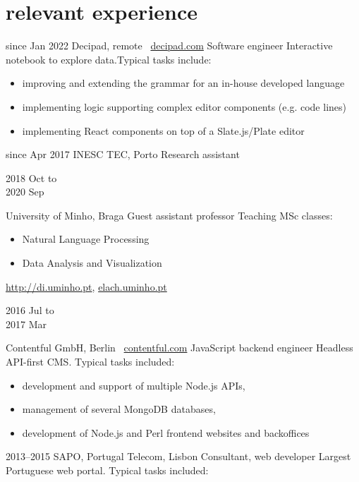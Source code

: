 \documentclass[a4paper]{friggeri-cv}
\begin{document}
\section{relevant experience}
\begin{entrylist}
  \entry
    {{\tiny since} Jan 2022}
    {Decipad, remote \textendash~\url{decipad.com}}
    {Software engineer}
    {Interactive  notebook to explore data.\footnotesize{Typical tasks
    include:}}
    {\begin{itemize}
      \item improving and extending the grammar for an in-house developed language
      \item implementing logic supporting complex editor components (e.g. code lines)
      \item implementing React components on top of a Slate.js/Plate editor
    \end{itemize}}
  \entry
    {{\tiny since} Apr 2017}
    {INESC TEC, Porto}
    {Research assistant}
    {\vspace{-0.7cm}}
    {}
  \entry
    {\parbox[t][][t]{1.8cm}{2018 {\footnotesize Oct to}\\2020
    {\footnotesize Sep}}}
    {University of Minho, Braga}
    {Guest assistant professor}
    {Teaching MSc classes:}
    {\begin{itemize}
        \item Natural Language Processing
        \item Data Analysis and Visualization
    \end{itemize}
    \url{http://di.uminho.pt}, \url{elach.uminho.pt}
    }
  \entry
    {\parbox[t][][t]{1.8cm}{2016 {\footnotesize Jul to}\\2017 {\footnotesize Mar}}}
    {Contentful GmbH, Berlin \textendash~\url{contentful.com}}
    {JavaScript backend engineer}
    {Headless API-first CMS. \footnotesize{Typical tasks
    included:}}
    {\begin{itemize}
        \item development and support of multiple Node.js APIs,
        \item management of several MongoDB databases,
        \item development of Node.js and Perl frontend websites and backoffices
    \end{itemize}
    }
  \entry
    {2013--2015}
    {SAPO, Portugal Telecom, Lisbon}
    {Consultant, web developer}
    {Largest Portuguese web portal. \footnotesize{Typical tasks
    included:}}
    {\begin{itemize}

\end{itemize}}
\end{entrylist}
\end{document}
